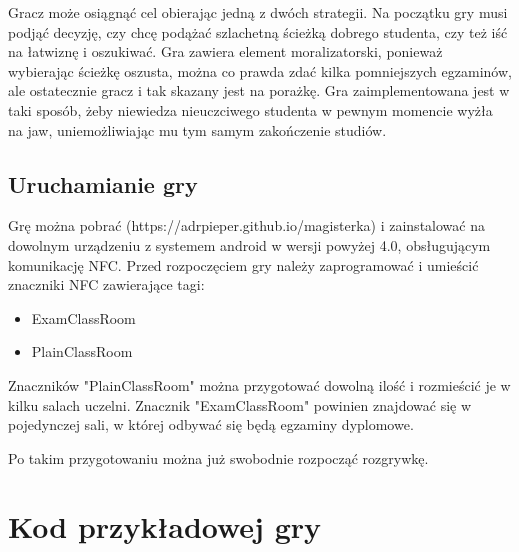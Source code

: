 \documentclass	{xmgr}
\begin{document}
Gracz może osiągnąć cel obierając jedną z dwóch strategii. Na początku gry musi podjąć decyzję, czy chcę podążać szlachetną ścieżką dobrego studenta, czy też iść na łatwiznę i oszukiwać. Gra zawiera element moralizatorski, ponieważ wybierając ścieżkę oszusta, można co prawda zdać kilka pomniejszych egzaminów, ale ostatecznie gracz i tak skazany jest na porażkę. Gra zaimplementowana jest w taki sposób, żeby niewiedza nieuczciwego studenta w pewnym momencie wyżła na jaw, uniemożliwiając mu tym samym zakończenie studiów.

\section{Uruchamianie gry}

Grę można pobrać (https://adrpieper.github.io/magisterka) i zainstalować na dowolnym urządzeniu z systemem android w wersji powyżej 4.0, obsługującym komunikację NFC. Przed rozpoczęciem gry należy zaprogramować i umieścić znaczniki NFC zawierające tagi:
\begin{itemize}
	\item ExamClassRoom
	\item PlainClassRoom
\end{itemize}
Znaczników "PlainClassRoom" można przygotować dowolną ilość i rozmieścić je w kilku salach uczelni. Znacznik "ExamClassRoom" powinien znajdować się w pojedynczej sali, w której odbywać się będą egzaminy dyplomowe.

Po takim przygotowaniu można już swobodnie rozpocząć rozgrywkę.

\appendix
\chapter{Kod przykładowej gry}
\end{document}

